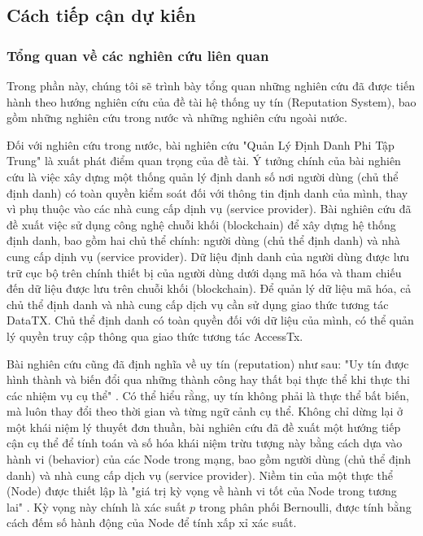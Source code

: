 \subsection{Cách tiếp cận dự kiến}

\subsubsection{Tổng quan về các nghiên cứu liên quan}
Trong phần này, chúng tôi sẽ trình bày tổng quan những nghiên cứu đã được tiến hành theo hướng nghiên cứu của đề tài hệ thống uy tín (Reputation System), bao gồm những nghiên cứu trong nước và những nghiên cứu ngoài nước.
\par

Đối với nghiên cứu trong nước, bài nghiên cứu "Quản Lý Định Danh Phi Tập Trung" \cite{quan-ly-dinh-danh-phi-tap-trung} là xuất phát điểm quan trọng của đề tài. Ý tưởng chính của bài nghiên cứu là việc xây dựng một thống quản lý định danh số nơi người dùng (chủ thể định danh) có toàn quyền kiểm soát đối với thông tin định danh của mình, thay vì phụ thuộc vào các nhà cung cấp dịnh vụ (service provider). Bài nghiên cứu đã đề xuất việc sử dụng công nghệ chuỗi khối (blockchain) để xây dựng hệ thống định danh, bao gồm hai chủ thể chính: người dùng (chủ thể định danh) và nhà cung cấp dịnh vụ (service provider). Dữ liệu định danh của người dùng được lưu trữ cục bộ trên chính thiết bị của người dùng dưới dạng mã hóa và tham chiếu đến dữ liệu được lưu trên chuỗi khối (blockchain). Để quản lý dữ liệu mã hóa, cả chủ thể định danh và nhà cung cấp dịch vụ cần sử dụng giao thức tương tác DataTX. Chủ thể định danh có toàn quyền đối với dữ liệu của mình, có thể quản lý quyền truy cập thông qua giao thức tương tác AccessTx.
\par
Bài nghiên cứu cũng đã định nghĩa về uy tín (reputation) như sau: "Uy tín được hình thành và biến đổi qua những thành công hay thất bại thực thể khi thực thi các nhiệm vụ cụ thể" \cite{quan-ly-dinh-danh-phi-tap-trung,a-survey-of-trust-in-internet-applications}. Có thể hiểu rằng, uy tín không phải là thực thể bất biến, mà luôn thay đổi theo thời gian và từng ngữ cảnh cụ thể. Không chỉ dừng lại ở một khái niệm lý thuyết đơn thuần, bài nghiên cứu đã đề xuất một hướng tiếp cận cụ thể để tính toán và số hóa khái niệm trừu tượng này bằng cách dựa vào hành vi (behavior) của các Node trong mạng, bao gồm người dùng (chủ thể định danh) và nhà cung cấp dịch vụ (service provider). Niềm tin của một thực thể (Node) được thiết lập là "giá trị kỳ vọng về hành vi tốt của Node trong tương lai" \cite{quan-ly-dinh-danh-phi-tap-trung}. Kỳ vọng này chính là xác suất \(p\) trong phân phối Bernoulli, được tính bằng cách đếm số hành động của Node để tính xấp xỉ xác suất. \cite{thong-ke-may-tinh,quan-ly-dinh-danh-phi-tap-trung}
\par

